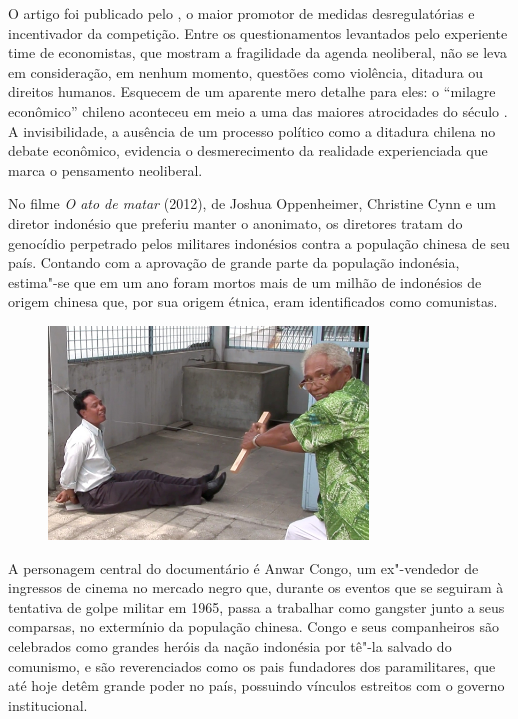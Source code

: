 O artigo foi publicado pelo , o maior promotor de medidas
desregulatórias e incentivador da competição. Entre os questionamentos
levantados pelo experiente time de economistas, que mostram a
fragilidade da agenda neoliberal, não se leva em consideração, em nenhum
momento, questões como violência, ditadura ou direitos humanos.
Esquecem de um aparente mero detalhe para eles: o ``milagre econômico''
chileno aconteceu em meio a uma das maiores atrocidades do século . A
invisibilidade, a ausência de um processo político como a ditadura
chilena no debate econômico, evidencia o desmerecimento da realidade
experienciada que marca o pensamento neoliberal.

\asterisc

No filme \emph{O ato de matar} (2012), de Joshua Oppenheimer, Christine
Cynn e um diretor indonésio que preferiu manter o anonimato, os
diretores tratam do genocídio perpetrado pelos militares indonésios
contra a população chinesa de seu país. Contando com a aprovação de grande parte
da população indonésia, estima"-se que em um ano foram mortos mais de um milhão de
indonésios de origem chinesa que, por sua origem étnica, eram identificados como comunistas.

\begin{figure}[!ht]
\centering
 \includegraphics[width=85mm]{./imgs/frame1.png}
\caption{\tiny{}}
\end{figure}


A personagem central do documentário é Anwar Congo, um ex"-vendedor de ingressos de
cinema no mercado negro que, durante os eventos que se seguiram à
tentativa de golpe militar em 1965, passa a trabalhar como gangster
junto a seus comparsas, no extermínio da população chinesa. Congo e seus
companheiros são celebrados como grandes heróis da nação indonésia por
tê"-la salvado do comunismo, e são reverenciados como os pais fundadores
dos paramilitares, que até hoje detêm grande poder no país, possuindo vínculos
estreitos com o governo institucional.

